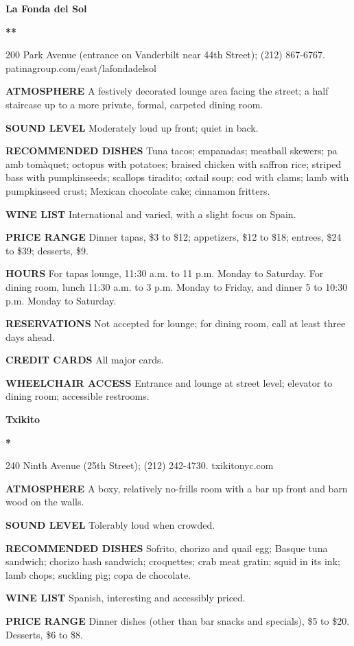 \textbf{La Fonda del Sol}

\textbf{**}

200 Park Avenue (entrance on Vanderbilt near 44th Street); (212)
867-6767. patinagroup.com/east/lafondadelsol

\textbf{ATMOSPHERE} A festively decorated lounge area facing the street;
a half staircase up to a more private, formal, carpeted dining room.

\textbf{SOUND LEVEL} Moderately loud up front; quiet in back.

\textbf{RECOMMENDED DISHES} Tuna tacos; empanadas; meatball skewers; pa
amb tomàquet; octopus with potatoes; braised chicken with saffron rice;
striped bass with pumpkinseeds; scallops tiradito; oxtail soup; cod with
clams; lamb with pumpkinseed crust; Mexican chocolate cake; cinnamon
fritters.

\textbf{WINE LIST} International and varied, with a slight focus on
Spain.

\textbf{PRICE RANGE} Dinner tapas, \$3 to \$12; appetizers, \$12 to
\$18; entrees, \$24 to \$39; desserts, \$9.

\textbf{HOURS} For tapas lounge, 11:30 a.m. to 11 p.m. Monday to
Saturday. For dining room, lunch 11:30 a.m. to 3 p.m. Monday to Friday,
and dinner 5 to 10:30 p.m. Monday to Saturday.

\textbf{RESERVATIONS} Not accepted for lounge; for dining room, call at
least three days ahead.

\textbf{CREDIT CARDS} All major cards.

\textbf{WHEELCHAIR ACCESS} Entrance and lounge at street level; elevator
to dining room; accessible restrooms.

\textbf{Txikito}

\textbf{*}

240 Ninth Avenue (25th Street); (212) 242-4730. txikitonyc.com

\textbf{ATMOSPHERE} A boxy, relatively no-frills room with a bar up
front and barn wood on the walls.

\textbf{SOUND LEVEL} Tolerably loud when crowded.

\textbf{RECOMMENDED DISHES} Sofrito, chorizo and quail egg; Basque tuna
sandwich; chorizo hash sandwich; croquettes; crab meat gratin; squid in
its ink; lamb chops; suckling pig; copa de chocolate.

\textbf{WINE LIST} Spanish, interesting and accessibly priced.

\textbf{PRICE RANGE} Dinner dishes (other than bar snacks and specials),
\$5 to \$20. Desserts, \$6 to \$8.

